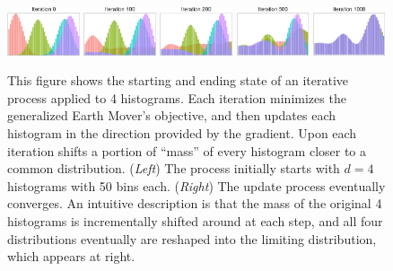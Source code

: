 \begin{figure}[ht]
    \centering
    \includegraphics[width=0.19\textwidth]{chap5/hists/hists_iter_0.pdf}
    \includegraphics[width=0.19\textwidth]{chap5/hists/hists_iter_100.pdf}
    \includegraphics[width=0.19\textwidth]{chap5/hists/hists_iter_200.pdf}
    \includegraphics[width=0.19\textwidth]{chap5/hists/hists_iter_500.pdf}
    \includegraphics[width=0.19\textwidth]{chap5/hists/hists_iter_1000.pdf}
    \caption{This figure shows the starting and ending state of an iterative process applied to 4 histograms. Each iteration minimizes the generalized Earth Mover's objective, and then updates each histogram in the direction provided by the gradient. Upon each iteration shifts a portion of ``mass'' of every histogram closer to a common distribution. ({\em Left}) The process initially starts with $d=4$ histograms with 50 bins each. ({\em Right}) The update process eventually converges. An intuitive description is that the mass of the original 4 histograms is incrementally shifted around at each step, and all four distributions eventually are reshaped into the limiting distribution, which appears at right. }
    \label{fig:hists}
\end{figure}

